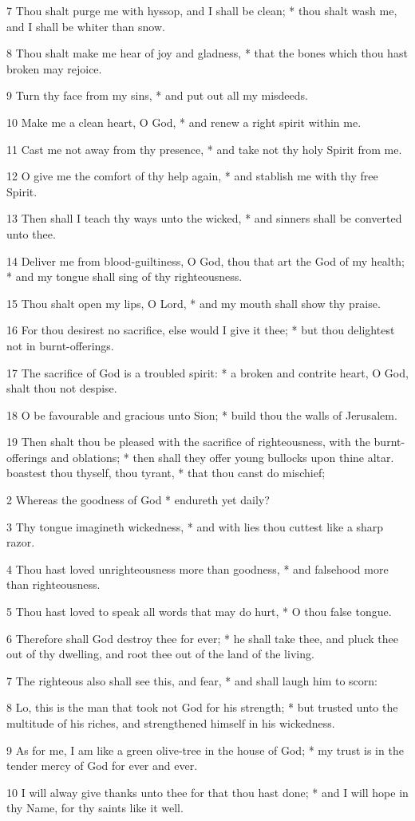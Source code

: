 7 Thou shalt purge me with hyssop, and I shall be clean; * thou shalt wash me, and I shall be whiter than snow.\par
8 Thou shalt make me hear of joy and gladness, * that the bones which thou hast broken may rejoice.\par
9 Turn thy face from my sins, * and put out all my misdeeds.\par
10 Make me a clean heart, O God, * and renew a right spirit within me.\par
11 Cast me not away from thy presence, * and take not thy holy Spirit from me.\par
12 O give me the comfort of thy help again, * and stablish me with thy free Spirit.\par
13 Then shall I teach thy ways unto the wicked, * and sinners shall be converted unto thee.\par
14 Deliver me from blood-guiltiness, O God, thou that art the God of my health; * and my tongue shall sing of thy righteousness.\par
15 Thou shalt open my lips, O Lord, * and my mouth shall show thy praise.\par
16 For thou desirest no sacrifice, else would I give it thee; * but thou delightest not in burnt-offerings.\par
17 The sacrifice of God is a troubled spirit: * a broken and contrite heart, O God, shalt thou not despise.\par
18 O be favourable and gracious unto Sion; * build thou the walls of Jerusalem.\par
19 Then shalt thou be pleased with the sacrifice of righteousness, with the burnt-offerings and oblations; * then shall they offer young bullocks upon thine altar.
 boastest thou thyself, thou tyrant, * that thou canst do mischief;\par
2 Whereas the goodness of God * endureth yet daily?\par
3 Thy tongue imagineth wickedness, * and with lies thou cuttest like a sharp razor.\par
4 Thou hast loved unrighteousness more than goodness, * and falsehood more than righteousness.\par
5 Thou hast loved to speak all words that may do hurt, * O thou false tongue.\par
6 Therefore shall God destroy thee for ever; * he shall take thee, and pluck thee out of thy dwelling, and root thee out of the land of the living.\par
7 The righteous also shall see this, and fear, * and shall laugh him to scorn:\par
8 Lo, this is the man that took not God for his strength; * but trusted unto the multitude of his riches, and strengthened himself in his wickedness.\par
9 As for me, I am like a green olive-tree in the house of God; * my trust is in the tender mercy of God for ever and ever.\par
10 I will alway give thanks unto thee for that thou hast done; * and I will hope in thy Name, for thy saints like it well.
